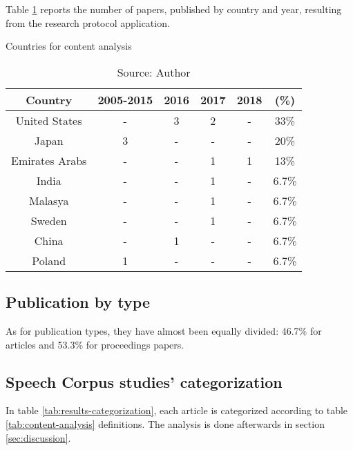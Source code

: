 Table \ref{tab:country-analysis} reports the number of papers, published by country and year, resulting from the research protocol application.

\begin{table}[h]
    \centering
    \caption{Countries for content analysis}
    \begin{tabular}{|c|c|c|c|c|c|}
        \hline Country & 2005-2015 & 2016 & 2017 & 2018 & (\%) \\ \hline
        United States & - & 3 & 2 & - & 33\% \\ \hline 
        Japan & 3 & - & - & - & 20\% \\ \hline
        Emirates Arabs & - & - & 1 & 1 & 13\% \\ \hline
        India & - & - & 1 & - & 6.7\% \\ \hline
        Malasya & - & - & 1 & - & 6.7\% \\ \hline
        Sweden & - & - & 1 & - & 6.7\% \\ \hline
        China & - & 1 & - & - & 6.7\% \\ \hline
        Poland & 1 & - & - & - & 6.7\% \\ \hline
    \end{tabular}
    \caption*{Source: Author}
    \label{tab:country-analysis}
\end{table}

\subsection{Publication by type}

As for publication types, they have almost been equally divided: 46.7\% for articles and 53.3\% for proceedings papers.

\subsection{Speech Corpus studies' categorization}

In table \ref{tab:results-categorization}, each article is categorized according to table \ref{tab:content-analysis} definitions. The analysis is done afterwards in section \ref{sec:discussion}.

